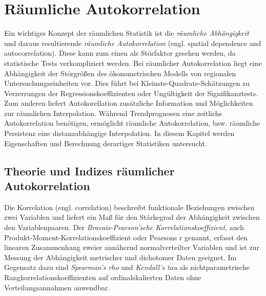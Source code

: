 \chapter{Räumliche Autokorrelation}
\label{ch:autocorrelation}





Ein wichtiges Konzept der räumlichen Statistik ist die \emph{räumliche Abhängigkeit} und daraus 
resultierende \emph{räumliche Autokorrelation} (engl. spatial dependence and autocorrelation).
Diese kann zum einen als Störfaktor gesehen werden, da statistische Tests verkompliziert werden. 
Bei räumlicher Autokorrelation liegt eine Abhängigkeit der Störgrößen des ökonometrischen Modells von regionalen 
Untersuchungseinheiten vor. Dies führt bei Kleinste-Quadrate-Schätzungen zu Verzerrungen der Regressionskoeffizienten 
oder Ungültigkeit der Signifikanztests. Zum anderen liefert Autokorellation zusätzliche Information und Möglichkeiten 
zur räumlichen Interpolation. Während Trendprognosen eine zeitliche Autokorrelation benötigen, 
ermöglicht räumliche Autokorrelation, bzw. räumliche Persistenz eine distanzabhängige Interpolation. 
In diesem Kapitel werden Eigenschaften und Berechnung derartiger Statistiken untersucht.

\section{Theorie und Indizes räumlicher Autokorrelation}
Die Korrelation (engl. correlation) beschreibt funktionale Beziehungen zwischen zwei 
Variablen und liefert ein Maß für den Stärkegrad der Abhängigkeit zwischen den Variablenpaaren. 
Der \emph{Bravais-Pearson’sche Korrelationskoeffizient}, auch Produkt-Moment-Korrelationskoeffizient oder Pearsons r genannt, 
erfasst den linearen Zusammenhang zweier annähernd normalverteilter Variablen und ist zur Messung der Abhängigkeit 
metrischer und dichotomer Daten geeignet. Im Gegensatz dazu sind \emph{Spearman’s rho} und 
\emph{Kendall’s tau} als nichtparametrische Rangkorrelationskoeffizienten auf ordinalskalierten Daten ohne Verteilungsannahmen anwendbar.


